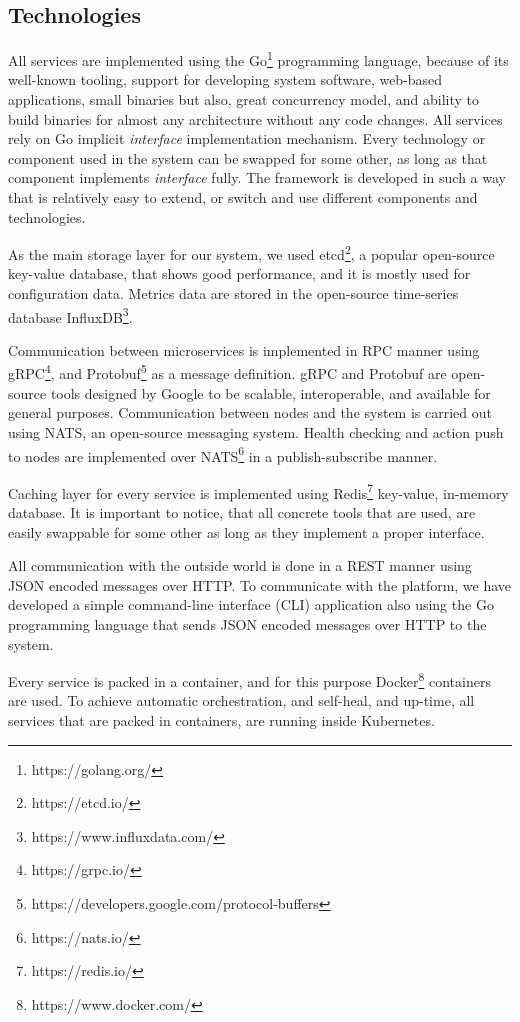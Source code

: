 \subsection{Technologies}\label{sec:technologies}
%
All services are implemented using the Go\footnote{https://golang.org/} programming language, because of its well-known tooling, support for developing system software, web-based applications, small binaries but also, great concurrency model, and ability to build binaries for almost any architecture without any code changes. All services rely on Go implicit \emph{interface} implementation mechanism. Every technology or component used in the system can be swapped for some other, as long as that component implements \emph{interface} fully. The framework is developed in such a way that is relatively easy to extend, or switch and use different components and technologies.

As the main storage layer for our system, we used etcd\footnote{https://etcd.io/}, a popular open-source key-value database, that shows good performance, and it is mostly used for configuration data. Metrics data are stored in the open-source time-series database InfluxDB\footnote{https://www.influxdata.com/}. 

Communication between microservices is implemented in RPC manner using gRPC\footnote{https://grpc.io/}, and Protobuf\footnote{https://developers.google.com/protocol-buffers} as a message definition. gRPC and Protobuf are open-source tools designed by Google to be scalable, interoperable, and available for general purposes. Communication between nodes and the system is carried out using NATS, an open-source messaging system. Health checking and action push to nodes are implemented over NATS\footnote{https://nats.io/} in a publish-subscribe manner.

Caching layer for every service is implemented using Redis\footnote{https://redis.io/} key-value, in-memory database. It is important to notice, that all concrete tools that are used, are easily swappable for some other as long as they implement a proper interface.

All communication with the outside world is done in a REST manner using JSON encoded messages over HTTP. To communicate with the platform, we have developed a simple command-line interface (CLI) application also using the Go programming language that sends JSON encoded messages over HTTP to the system.

Every service is packed in a container, and for this purpose Docker\footnote{https://www.docker.com/} containers are used. To achieve automatic orchestration, and self-heal, and up-time, all services that are packed in containers, are running inside Kubernetes.

